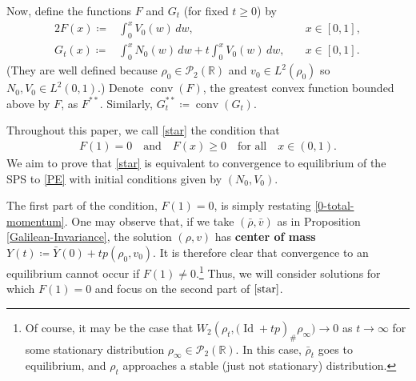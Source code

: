 \documentclass[10pt,a4paper]{amsart}
\numberwithin{equation}{section}
\DeclareMathOperator{\Id}{Id}
\DeclareMathOperator{\conv}{conv}
\begin{document}
    Now, define the functions $F$ and $G_t$ (for fixed $t\geq0$) by 
    \begin{alignat}{2}\label{F-def}
        F(x)\coloneq&\int_0^xV_0(w) \, dw, \quad &x\in[0,1],
        \\
        \label{G-def}
        G_t(x)\coloneq&\int_0^x N_0(w) \, dw+t\int_0^xV_0(w) \, dw, \quad &x\in[0,1].
    \end{alignat}
    (They are well defined because $\rho_0\in\mathcal{P}_2(\mathbb{R})$ and $v_0\in L^2(\rho_0)$ so $N_0,V_0\in L^2(0,1)$.) Denote $\conv(F)$, the greatest convex function bounded above by $F$, as $F^{**}$. Similarly, $G_t^{**}\coloneq \conv(G_t)$.

    Throughout this paper, we call \eqref{star} the condition that 
    \begin{align}\label{star}\tag{$\bigstar$}
        F(1)=0 \quad\text{and}\quad F(x)\geq0 \quad\text{for all}\quad x\in(0, 1). 
    \end{align}
    We aim to prove that \eqref{star} is equivalent to convergence to equilibrium of the SPS to \eqref{PE} with initial conditions given by $(N_0, V_0)$.

    The first part of the condition, $F(1)=0$, is simply restating \eqref{0-total-momentum}. One may observe that, if we take $(\bar{\rho},\bar{v})$ as in Proposition \ref{Galilean-Invariance}, the solution $(\rho,v)$ has \textbf{center of mass} $Y(t)\coloneq\bar{Y}(0)+tp(\rho_0,v_0)$. It is therefore clear that convergence to an equilibrium cannot occur if $F(1)\neq0$.\footnote{Of course, it may be the case that $W_2(\rho_t,\big(\Id+tp)_\#\rho_\infty\big)\to0$ as $t\to\infty$ for some stationary distribution $\rho_\infty\in\mathcal{P}_2(\mathbb{R})$. In this case, $\bar{\rho}_t$ goes to equilibrium, and $\rho_t$ approaches a stable (just not stationary) distribution.} Thus, we will consider solutions for which $F(1)=0$ and focus on the second part of $\eqref{star}$.
\end{document}
